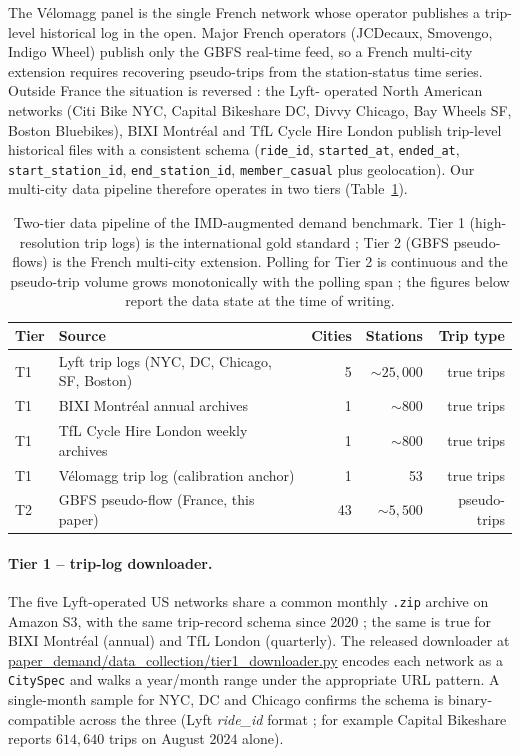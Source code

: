 \documentclass[11pt,a4paper]{article}
\begin{document}
The V\'elomagg panel is the single French network whose
operator publishes a trip-level historical log in the open.
Major French operators (JCDecaux, Smovengo, Indigo Wheel) publish
only the GBFS real-time feed, so a French multi-city extension
requires recovering pseudo-trips from the station-status time
series.  Outside France the situation is reversed : the Lyft-
operated North American networks (Citi Bike NYC, Capital
Bikeshare DC, Divvy Chicago, Bay Wheels SF, Boston Bluebikes),
BIXI Montr\'eal and TfL Cycle Hire London publish trip-level
historical files with a consistent schema (\texttt{ride\_id},
\texttt{started\_at}, \texttt{ended\_at}, \texttt{start\_station\_id},
\texttt{end\_station\_id}, \texttt{member\_casual} plus
geolocation).  Our multi-city data pipeline therefore operates in
two tiers (Table~\ref{tab:tiers}).

\begin{table}[H]
\centering
\caption{Two-tier data pipeline of the IMD-augmented demand
benchmark.  Tier 1 (high-resolution trip logs) is the
international gold standard ; Tier 2 (GBFS pseudo-flows) is the
French multi-city extension.  Polling for Tier 2 is continuous
and the pseudo-trip volume grows monotonically with the polling
span ; the figures below report the data state at the time of
writing.}
\label{tab:tiers}
\small
\begin{tabular}{@{}llrrr@{}}
\toprule
Tier & Source & Cities & Stations & Trip type \\
\midrule
T1 & Lyft trip logs (NYC, DC, Chicago, SF, Boston) & 5 & $\sim 25{,}000$ & true trips \\
T1 & BIXI Montr\'eal annual archives           & 1 &  $\sim 800$  & true trips \\
T1 & TfL Cycle Hire London weekly archives     & 1 &  $\sim 800$  & true trips \\
T1 & V\'elomagg trip log (calibration anchor)   & 1 &      53      & true trips \\
\midrule
T2 & GBFS pseudo-flow (France, this paper)      & 43 & $\sim 5{,}500$ & pseudo-trips \\
\bottomrule
\end{tabular}
\end{table}

\paragraph{Tier 1 -- trip-log downloader.}
The five Lyft-operated US networks share a common monthly
\texttt{.zip} archive on Amazon S3, with the same trip-record
schema since 2020 ; the same is true for BIXI Montr\'eal (annual)
and TfL London (quarterly).  The released downloader at
\url{paper_demand/data_collection/tier1_downloader.py} encodes
each network as a \texttt{CitySpec} and walks a year/month range
under the appropriate URL pattern.  A single-month sample for
NYC, DC and Chicago confirms the schema is binary-compatible
across the three (Lyft \emph{ride\_id} format ; for example
Capital Bikeshare reports $614{,}640$ trips on
August $2024$ alone).
\end{document}
